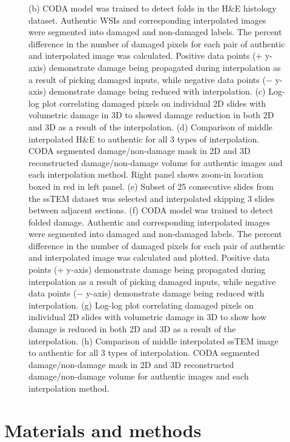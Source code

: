 \begin{refsection}
    \begin{figure}[h!]
        \ContinuedFloat
        \captionsetup{font=small}
        \caption[]{(b) CODA model was trained to detect folds in the H\&E histology dataset. Authentic WSIs and corresponding interpolated images were segmented into damaged and non-damaged labels. The percent difference in the number of damaged pixels for each pair of authentic and interpolated image was calculated. Positive data points (+ y-axis) demonstrate damage being propagated during interpolation as a result of picking damaged inputs, while negative data points (− y-axis) demonstrate damage being reduced with interpolation. (c) Log-log plot correlating damaged pixels on individual 2D slides with volumetric damage in 3D to showed damage reduction in both 2D and 3D as a result of the interpolation. (d) Comparison of middle interpolated H\&E to authentic for all 3 types of interpolation. CODA segmented damage/non-damage mask in 2D and 3D reconstructed damage/non-damage volume for authentic images and each interpolation method. Right panel shows zoom-in location boxed in red in left panel. (e) Subset of 25 consecutive slides from the ssTEM dataset was selected and interpolated skipping 3 slides between adjacent sections. (f) CODA model was trained to detect folded damage. Authentic and corresponding interpolated images were segmented into damaged and non-damaged labels. The percent difference in the number of damaged pixels for each pair of authentic and interpolated image was calculated and plotted. Positive data points (+ y-axis) demonstrate damage being propagated during interpolation as a result of picking damaged inputs, while negative data points (− y-axis) demonstrate damage being reduced with interpolation. (g) Log-log plot correlating damaged pixels on individual 2D slides with volumetric damage in 3D to show how damage is reduced in both 2D and 3D as a result of the interpolation. (h) Comparison of middle interpolated ssTEM image to authentic for all 3 types of interpolation. CODA segmented damage/non-damage mask in 2D and 3D reconstructed damage/non-damage volume for authentic images and each interpolation method.}
    \end{figure}
    
    \section{Materials and methods}

\end{refsection}
